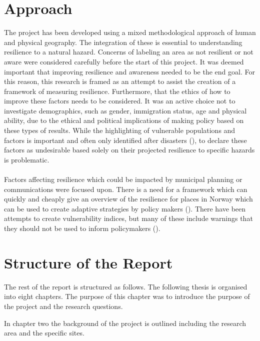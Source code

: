 \section{Approach}

The project has been developed using a mixed methodological approach of human and physical geography. The integration of these is essential to understanding resilience to a natural hazard. Concerns of labeling an area as not resilient or not aware were considered carefully before the start of this project.  It was deemed important that improving resilience and awareness needed to be the end goal. For this reason, this research is framed as an attempt to assist the creation of a framework of measuring resilience. Furthermore, that the ethics of how to improve these factors needs to be considered. It was an active choice not to investigate demographics, such as gender, immigration status, age and physical ability, due to the ethical and political implications of making policy based on these types of results. While the highlighting of vulnerable populations and factors is important and often only identified after disasters (\cite{cutter_community_2020}), to declare these factors as undesirable based solely on their projected resilience to specific hazards is problematic. 

\paragraph{}
Factors affecting resilience which could be impacted by municipal planning or communications were focused upon. There is a need for a framework which can quickly and cheaply give an overview of the resilience for places in Norway which can be used to create adaptive strategies by policy makers (\cite{opach_seeking_2020}). There have been attempts to create vulnerability indices, but many of these include warnings that they should not be used to inform policymakers (\cite{opach_seeking_2020}).


\section{Structure of the Report}
The rest of the report is structured as follows. 
The following thesis is organised into eight chapters. The purpose of this chapter was to introduce the purpose of the project and the research questions.

In chapter two the background of the project is outlined including the research area and the specific sites. 

